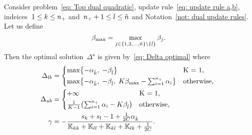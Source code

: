 \begin{lemma}\label{thm: toppushk family quadratic update a,b}
  Consider problem~\eqref{eq: Top dual quadratic}, update rule~\eqref{eq: update rule a,b}, indeices~$1 \leq k \leq n_{+}$ and~$n_{+} + 1 \leq l \leq \tilde{n}$  and Notation~\ref{not: dual update rules}. Let us define
  \begin{equation*}
    \beta_{\max} = \max_{j \in \{1, 2, \ldots, \tilde{n} \} \setminus \{\hat{l}\}} \beta_j.
  \end{equation*}
  Then the optimal solution~$\Delta^{\star}$ is given by~\eqref{eq: Delta optimal} where
  \begin{align*}
    \Delta_{lb} & = 
      \begin{cases*}
        \max \Brac[c]{- \alphak,\;  -\betal} & K = 1, \\
        \max \Brac[c]{- \alphak,\;  -\betal, \; K\beta_{\max} - \sum_{i = 1}^{\npos} \alpha_i} & \textrm{otherwise},
      \end{cases*} \\
    \Delta_{ub} & = 
      \begin{cases*}
        + \infty & K = 1, \\
        \frac{1}{K-1}\Brac{\sum_{i = 1}^{\npos} \alpha_i - K \betal} & \textrm{otherwise},
      \end{cases*} \\
    \gamma & = -\frac{s_k + s_l - 1 + \frac{1}{2C} \alphak}{\K_{kk} + \K_{ll} + \K_{kl} + \K_{lk} + \frac{1}{2C}}.
  \end{align*}
\end{lemma}

